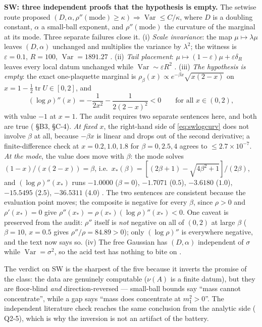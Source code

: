 \textbf{SW: three independent proofs that the hypothesis is empty.} The setwise route proposed
$(D,\alpha,\rho''(\text{mode})\ge\kappa)\Rightarrow\operatorname{Var}\le C/\kappa$, where $D$ is a
doubling constant, $\alpha$ a small-ball exponent, and $\rho''(\text{mode})$ the curvature of the
marginal at its mode. Three separate failures close it. (i) \emph{Scale invariance}: the map
$\mu\mapsto\lambda\mu$ leaves $(D,\alpha)$ unchanged and multiplies the variance by $\lambda^2$;
the witness is $\varepsilon=0.1$, $R=100$, $\operatorname{Var}=1891.27$ \LN. (ii) \emph{Tail
placement}: $\mu\mapsto(1-\varepsilon)\mu+\varepsilon\delta_R$ leaves every local datum unchanged
while $\operatorname{Var}\sim\varepsilon R^2$ \LN. (iii) \emph{The hypothesis is empty}: the exact
one-plaquette marginal is $\rho_\beta(x)\propto e^{-\beta x}\sqrt{x(2-x)}$ on $x=1-\tfrac12
\operatorname{tr}U\in[0,2]$, and
\[
  (\log\rho)''(x)=-\frac{1}{2x^{2}}-\frac{1}{2(2-x)^{2}}<0
  \qquad\text{for all }x\in(0,2),
  \label{eq:swlogcurv}
\]
with value $-1$ at $x=1$. The audit requires two separate sentences here, and both are true
( \S B3, \S C-4). \emph{At fixed $x$}, the right-hand side of \eqref{eq:swlogcurv}
does not involve $\beta$ at all, because $-\beta x$ is linear and drops out of the second
derivative; a finite-difference check at $x=0.2,1.0,1.8$ for $\beta=0,2.5,4$ agrees to
$\le2.7\times10^{-7}$. \emph{At the mode}, the value does move with $\beta$: the mode solves
$(1-x)/(x(2-x))=\beta$, i.e.\ $x_*(\beta)=[(2\beta+1)-\sqrt{4\beta^2+1}]/(2\beta)$, and
$(\log\rho)''(x_*)$ runs $-1.0000$ ($\beta=0$), $-1.7071$ ($0.5$), $-3.6180$ ($1.0$), $-15.5495$
($2.5$), $-36.5311$ ($4.0$) \LE. The two sentences are consistent because the evaluation point
moves; the composite is negative for every $\beta$, since $\rho>0$ and $\rho'(x_*)=0$ give
$\rho''(x_*)=\rho(x_*)(\log\rho)''(x_*)<0$. One caveat is preserved from the audit: $\rho''$ itself
is \emph{not} negative on all of $(0,2)$ at large $\beta$ ($\beta=10$, $x=0.5$ gives
$\rho''/\rho=84.89>0$); only $(\log\rho)''$ is everywhere negative, and the text now says so.
(iv) The free Gaussian has $(D,\alpha)$ independent of $\sigma$ while $\operatorname{Var}=\sigma^2$,
so the acid test has nothing to bite on \LN.

The verdict on SW is the sharpest of the five because it inverts the promise of the class: the data
are genuinely computable ($\nu(A)$ is a finite datum), but they are floor-blind \emph{and}
direction-reversed --- small-ball bounds say ``mass cannot concentrate'', while a gap says ``mass
does concentrate at $m_1^2>0$''. The independent literature check reaches the same conclusion from
the analytic side ( Q2-5), which is why the inversion is not an artifact of the
battery.

